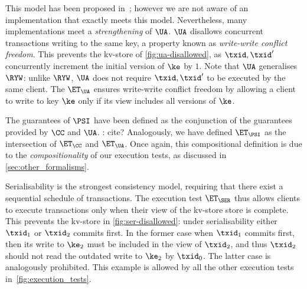   

This model has been proposed in~\cite{framework-concur};
however we are not aware of an implementation that exactly meets  this model.
Nevertheless, many implementations meet a
\emph{strengthening} of $\UA$.
$\UA$ disallows concurrent transactions writing to the same key,
a property known as \emph{write-write conflict freedom}.
This prevents the kv-store of \cref{fig:ua-disallowed},
as $\txid, \txid'$ concurrently increment the initial version of $\ke$ by $1$.
Note that $\UA$ generalises $\RYW$: unlike $\RYW$, $\UA$ does not require $\txid, \txid'$ to be executed by the same client.
The  $\ET_\UA$ ensures write-write conflict freedom by allowing a client to write to key $\ke$
only if its view includes all versions of $\ke$.

The guarantees of $\PSI$ have been defined as the conjunction of the guarantees provided by $\CC$ and $\UA$. \todo: cite?
Analogously, we have defined $\ET_\PSI$ as the intersection of $\ET_\CC$ and $\ET_\UA$. 
Once again, this compositional definition is due to the \emph{compositionality} of our execution tests, as discussed in \cref{sec:other_formalisms}.





Serialisability is the strongest consistency model, requiring that there exist a sequential schedule of transactions. 
The execution test $\ET_{\SER}$ thus allows clients to execute transactions only when 
their view of the kv-store store is complete.
This prevents the kv-store in  \cref{fig:ser-disallowed}: under serialisability either $\txid_1$ or $\txid_2$ commits first.
In the former case when $\txid_1$ commits first, then its write to $\ke_2$ must be included in the view of $\txid_2$, and thus $\txid_2$ should not read the outdated write to $\ke_2$ by $\txid_0$. 
The latter case is analogously prohibited. 
This example is allowed by all the other execution tests in~\cref{fig:execution_tests}.


